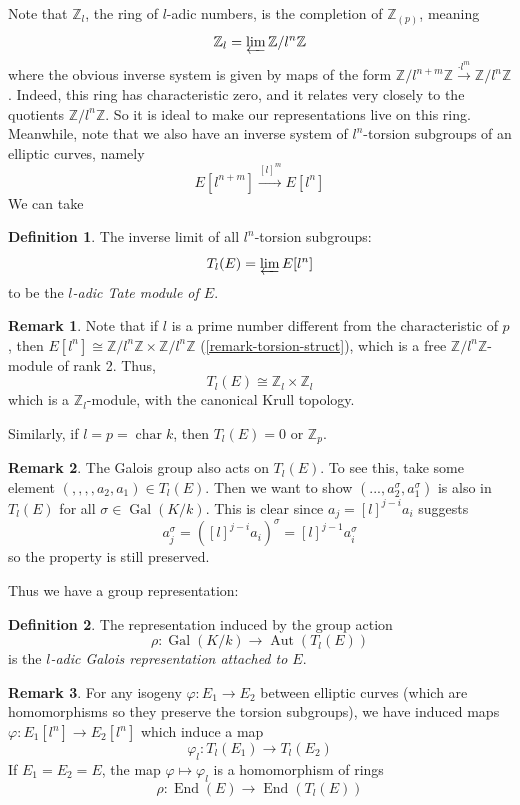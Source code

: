 \documentclass[12pt]{article}
\theoremstyle{remark}
\theoremstyle{definition}
\newtheorem{remark}{Remark}[subsection]
\newtheorem{definition}{Definition}[subsection]
\newcommand{\s}[0]{\sigma}
\newcommand{\Z}[0]{\mathbb{Z}}
\newcommand{\Aut}[0]{\operatorname{Aut}}
\newcommand{\Gal}[0]{\operatorname{Gal}}
\newcommand{\End}[0]{\operatorname{End}}
\begin{document}
        Note that $\Z_l$, the ring of $l$-adic numbers, is the completion of $\Z_{(p)}$, meaning
        \[\Z_l=\varprojlim\Z/l^n\Z\]
        where the obvious inverse system is given by maps of the form $\Z/l^{n+m}\Z\xrightarrow{\cdot l^m}\Z/l^n\Z$. Indeed, this ring has characteristic zero, and it relates very closely to the quotients $\Z/l^n\Z$. So it is ideal to make our representations live on this ring.  Meanwhile, note that we also have an inverse system of $l^n$-torsion subgroups of an elliptic curves, namely
        \[E[l^{n+m}]\xrightarrow{[l]^m}E[l^n]\]
        We can take 
        \begin{definition}
            The inverse limit of all $l^n$-torsion subgroups:
            \[T_l(E)=\varprojlim E[l^n]\]
            to be the \textit{$l$-adic Tate module of $E$}.
        \end{definition}
        \begin{remark}
            Note that if $l$ is a prime number different from the characteristic of $p$, then $E[l^n]\cong \Z/l^n\Z\times\Z/l^n\Z$ (\autoref{remark-torsion-struct}), which is a free $\Z/l^n\Z$-module of rank 2. Thus,
            \[T_l(E)\cong \Z_l\times\Z_l\]
            which is a $\Z_l$-module, with the canonical Krull topology.
            
            Similarly, if $l=p=\operatorname{char}k$, then $T_l(E)=0$ or $\Z_p$.
        \end{remark}
        \begin{remark}
            The Galois group also acts on $T_l(E)$. To see this, take some element $(,,,,a_2,a_1)\in T_l(E)$. Then we want to show $(...,a_2^\s,a_1^\s)$ is also in $T_l(E)$ for all $\s\in\Gal(K/k)$. This is clear since $a_j=[l]^{j-i}a_i$ suggests
            \[a_j^\s=([l]^{j-i}a_i)^\s=[l]^{j-1}a_i^\s\]
            so the property is still preserved.
        \end{remark}
        Thus we have a group representation:
        \begin{definition}
            The representation induced by the group action
            \[\rho:\Gal(K/k)\to \Aut(T_l(E))\]
            is the \textit{$l$-adic Galois representation attached to $E$}.
        \end{definition}
        \begin{remark}
            For any isogeny $\varphi:E_1\to E_2$ between elliptic curves (which are homomorphisms so they preserve the torsion subgroups), we have induced maps $\varphi:E_1[l^n]\to E_2[l^n]$ which induce a map
            \[\varphi_l:T_l(E_1)\to T_l(E_2)\]
            If $E_1=E_2=E$, the map $\varphi\mapsto\varphi_l$ is a homomorphism of rings
            \[\rho:\End(E)\to\End(T_l(E))\]
        \end{remark}
\end{document}

